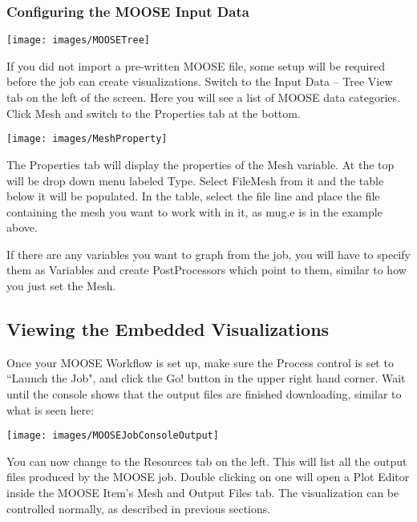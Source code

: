 \subsubsection{Configuring the MOOSE Input Data}

\begin{center}
\texttt{[image: images/MOOSETree]} 
\end{center}

If you did not import a pre-written MOOSE file, some setup will be
required before the job can create visualizations. Switch to the Input Data --
Tree View tab on the left of the screen. Here you will see a list of MOOSE data
categories. Click Mesh and switch to the Properties tab at the bottom.

\begin{center}
\texttt{[image: images/MeshProperty]} 
\end{center}

The Properties tab will display the properties of the Mesh variable. At the top
will be drop down menu labeled Type. Select FileMesh from it and the table below
it will be populated. In the table, select the file line and place the file
containing the mesh you want to work with in it, as mug.e is in the example
above.

If there are any variables you want to graph from the job, you will have to
specify them as Variables and create PostProcessors which point to them,
similar to how you just set the Mesh. 

\subsection{Viewing the Embedded Visualizations} 

Once your MOOSE Workflow is set up, make sure the Process control is set to
``Launch the Job", and click the Go! button in the upper right hand corner. Wait
until the console shows that the output files are finished downloading, similar
to what is seen here:

\begin{center} 
\texttt{[image: images/MOOSEJobConsoleOutput]} 
\end{center}

You can now change to the Resources tab on the left. This will list all the
output files produced by the MOOSE job. Double clicking on one will open a Plot
Editor inside the MOOSE Item's Mesh and Output Files tab. The visualization can
be controlled normally, as described in previous sections.  

